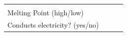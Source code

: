 \begin{enumerate}[noitemsep, label=\textbf{\arabic*}. ]
{\begin{center}
\begin{xtabular*}{\mytablewidth}[t]{|p{10\mystarwidth}|p{10\mystarwidth}|p{10\mystarwidth}|p{10\mystarwidth}|}
    
         &
    
    
         &
    
    
     \tabularnewline{}
    
    
        Melting Point (high/low) &
    
    
         &
    
    
         &
    
    
     \tabularnewline{}
    
    
        Conducts electricity? (yes/no) &
    

\end{xtabular*}
\end{center}}
\end{enumerate}
